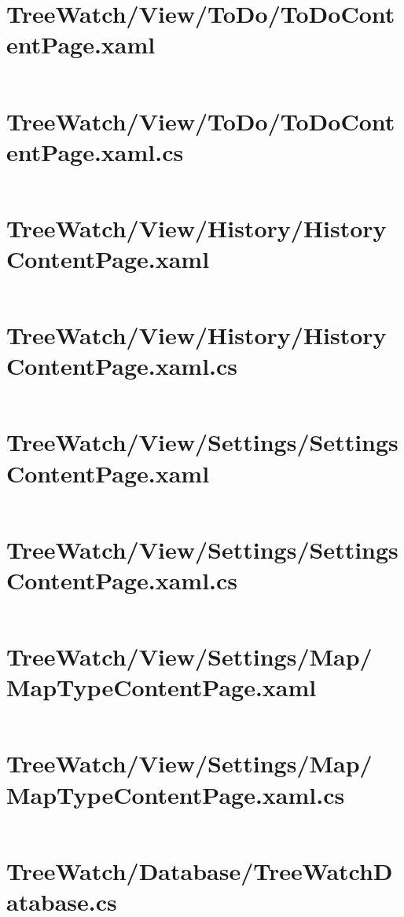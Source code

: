 \documentclass[12pt]{article}
\begin{document}
\section{TreeWatch/View/ToDo/ToDoContentPage.xaml}
\inputminted[linenos]{xml}{../../../src/TreeWatch/View/ToDo/ToDoContentPage.xaml}
\section{TreeWatch/View/ToDo/ToDoContentPage.xaml.cs}
\inputminted[linenos,firstline=22]{csharp}{../../../src/TreeWatch/View/ToDo/ToDoContentPage.xaml.cs}
\section{TreeWatch/View/History/HistoryContentPage.xaml}
\inputminted[linenos]{xml}{../../../src/TreeWatch/View/History/HistoryContentPage.xaml}
\section{TreeWatch/View/History/HistoryContentPage.xaml.cs}
\inputminted[linenos,firstline=22]{csharp}{../../../src/TreeWatch/View/History/HistoryContentPage.xaml.cs}
\section{TreeWatch/View/Settings/SettingsContentPage.xaml}
\inputminted[linenos]{xml}{../../../src/TreeWatch/View/Settings/SettingsContentPage.xaml}
\section{TreeWatch/View/Settings/SettingsContentPage.xaml.cs}
\inputminted[linenos,firstline=22]{csharp}{../../../src/TreeWatch/View/Settings/SettingsContentPage.xaml.cs}
\section{TreeWatch/View/Settings/Map/ MapTypeContentPage.xaml}
\inputminted[linenos]{xml}{../../../src/TreeWatch/View/Settings/Map/MapTypeContentPage.xaml}
\section{TreeWatch/View/Settings/Map/ MapTypeContentPage.xaml.cs}
\inputminted[linenos,firstline=22]{csharp}{../../../src/TreeWatch/View/Settings/Map/MapTypeContentPage.xaml.cs}


\section{TreeWatch/Database/TreeWatchDatabase.cs}
\inputminted[linenos,firstline=22]{csharp}{../../../src/TreeWatch/Database/TreeWatchDatabase.cs}
\end{document}
